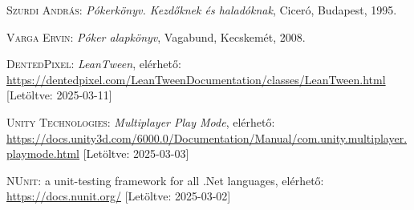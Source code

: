 \documentclass[]{thesis-ekf}
\theoremstyle{definition}
\theoremstyle{remark}
\begin{document}
\begin{thebibliography}{2}
	\textsc{Szurdi András}: \emph{Pókerkönyv. Kezdőknek és haladóknak}, Ciceró, Budapest, 1995.
	
	\textsc{Varga Ervin}: \emph{Póker alapkönyv}, Vagabund, Kecskemét, 2008.
	
	\textsc{DentedPixel}: \emph{LeanTween}, elérhető:
	\url{https://dentedpixel.com/LeanTweenDocumentation/classes/LeanTween.html} [Letöltve: 2025-03-11]
	
	\textsc{Unity Technologies}: \emph{Multiplayer Play Mode}, elérhető:
	\url{https://docs.unity3d.com/6000.0/Documentation/Manual/com.unity.multiplayer.playmode.html} [Letöltve: 2025-03-03]
	
	\textsc{NUnit}: a unit-testing framework for all .Net languages, elérhető: \url{https://docs.nunit.org/} [Letöltve: 2025-03-02]
	
\end{thebibliography}

%
\end{document}
